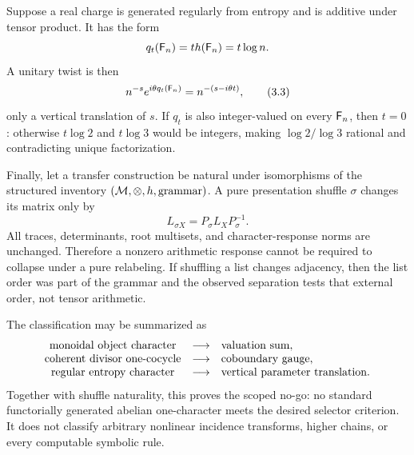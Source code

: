 Suppose a real charge is generated regularly from entropy and is additive
under tensor product.  It has the form
\[
  q_t(\mathsf F_n)=t h(\mathsf F_n)=t\log n.
\]
A unitary twist is then
\[
  n^{-s}e^{i\theta q_t(\mathsf F_n)}
  =n^{-(s-i\theta t)},
  \tag{3.3}
\]
only a vertical translation of $s$.  If $q_t$ is also integer-valued on every
$\mathsf F_n$, then $t=0$: otherwise $t\log2$ and $t\log3$ would be integers, making
$\log2/\log3$ rational and contradicting unique factorization.

Finally, let a transfer construction be natural under isomorphisms of the
structured inventory $(\mathcal M,\otimes,h,\text{grammar})$.  A pure presentation
shuffle $\sigma$ changes its matrix only by
\[
  L_{\sigma X}=P_\sigma L_XP_\sigma^{-1}.
  \tag{3.4}
\]
All traces, determinants, root multisets, and character-response norms are
unchanged.  Therefore a nonzero arithmetic response cannot be required to
collapse under a pure relabeling.  If shuffling a list changes adjacency,
then the list order was part of the grammar and the observed separation tests
that external order, not tensor arithmetic.

The classification may be summarized as
\[
\begin{array}{c@{\quad\longrightarrow\quad}l}
\text{monoidal object character} & \text{valuation sum},\\
\text{coherent divisor one-cocycle} & \text{coboundary gauge},\\
\text{regular entropy character} & \text{vertical parameter translation}.
\end{array}
\]
Together with shuffle naturality, this proves the scoped no-go: no standard
functorially generated abelian one-character meets the desired selector
criterion.  It does not classify arbitrary nonlinear incidence transforms,
higher chains, or every computable symbolic rule.
